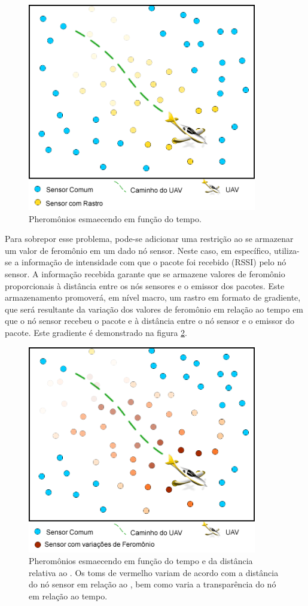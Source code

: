  \begin{figure}[h!]
 \centering
 \includegraphics[width=10cm]{pictures/flat_pheromone.png}
 \caption{Pheromônios esmaecendo em função do tempo.}
  \label{fig:flat}
 \end{figure}

Para sobrepor esse problema, pode-se adicionar uma restrição ao se armazenar um valor de feromônio em um dado nó sensor. Neste caso, em específico, utiliza-se a informação de intensidade com que o pacote foi recebido (RSSI) pelo nó sensor. A informação recebida garante que se armazene valores de feromônio proporcionais à distância entre os nós sensores e o emissor dos pacotes. Este armazenamento promoverá, em nível macro, um rastro em formato de gradiente, que será resultante da variação dos valores de feromônio em relação ao tempo em que o nó sensor recebeu o pacote e à distância entre o nó sensor e o \vant emissor do pacote. Este gradiente é demonstrado na figura \ref{fig:gradient}.

 \begin{figure}[h!]
 \centering
 \includegraphics[width=10cm]{pictures/gradient.png}
 \caption{Pheromônios esmaecendo em função do tempo e da distância relativa ao \vant. Os toms de vermelho variam de acordo com a distância do nó sensor em relação ao \vant, bem como varia a transparência do nó em relação ao tempo.}
  \label{fig:gradient}
 \end{figure}


